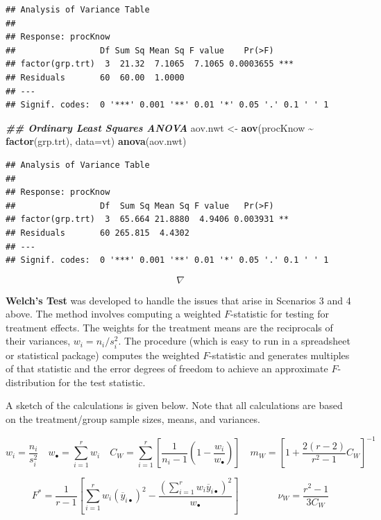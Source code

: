 \documentclass[
]{book}
\newenvironment{Shaded}{\begin{snugshade}}{\end{snugshade}}
\newcommand{\AttributeTok}[1]{\textcolor[rgb]{0.13,0.29,0.53}{#1}}
\newcommand{\DocumentationTok}[1]{\textcolor[rgb]{0.56,0.35,0.01}{\textbf{\textit{#1}}}}
\newcommand{\FunctionTok}[1]{\textcolor[rgb]{0.13,0.29,0.53}{\textbf{#1}}}
\newcommand{\NormalTok}[1]{#1}
\newcommand{\OtherTok}[1]{\textcolor[rgb]{0.56,0.35,0.01}{#1}}
\newcommand{\SpecialCharTok}[1]{\textcolor[rgb]{0.81,0.36,0.00}{\textbf{#1}}}
\begin{document}
\begin{verbatim}
## Analysis of Variance Table
## 
## Response: procKnow
##                 Df Sum Sq Mean Sq F value    Pr(>F)    
## factor(grp.trt)  3  21.32  7.1065  7.1065 0.0003655 ***
## Residuals       60  60.00  1.0000                      
## ---
## Signif. codes:  0 '***' 0.001 '**' 0.01 '*' 0.05 '.' 0.1 ' ' 1
\end{verbatim}

\begin{Shaded}
\begin{Highlighting}[]
\DocumentationTok{\#\# Ordinary Least Squares ANOVA}
\NormalTok{aov.nwt }\OtherTok{\textless{}{-}} \FunctionTok{aov}\NormalTok{(procKnow }\SpecialCharTok{\textasciitilde{}} \FunctionTok{factor}\NormalTok{(grp.trt), }\AttributeTok{data=}\NormalTok{vt)}
\FunctionTok{anova}\NormalTok{(aov.nwt)}
\end{Highlighting}
\end{Shaded}

\begin{verbatim}
## Analysis of Variance Table
## 
## Response: procKnow
##                 Df  Sum Sq Mean Sq F value   Pr(>F)   
## factor(grp.trt)  3  65.664 21.8880  4.9406 0.003931 **
## Residuals       60 265.815  4.4302                    
## ---
## Signif. codes:  0 '***' 0.001 '**' 0.01 '*' 0.05 '.' 0.1 ' ' 1
\end{verbatim}

\[ \nabla \]

\textbf{Welch's Test} was developed to handle the issues that arise in
Scenarios 3 and 4 above. The method involves computing a weighted
\(F\)-statistic for testing for treatment effects. The weights for the
treatment means are the reciprocals of their variances,
\(w_i=n_i/s_i^2\). The procedure (which is easy to run in a spreadsheet
or statistical package) computes the weighted \(F\)-statistic and
generates multiples of that statistic and the error degrees of freedom
to achieve an approximate \(F\)-distribution for the test statistic.

A sketch of the calculations is given below. Note that all calculations
are based on the treatment/group sample sizes, means, and variances.

\[
w_i = \frac{n_i}{s_i^2}  \quad w_{\bullet}=\sum_{i=1}^rw_i \quad
C_W=\sum_{i=1}^r\left[\frac{1}{n_i-1}\left(1-\frac{w_i}{w_{\bullet}}\right)
\right] \quad m_W=\left[1+\frac{2(r-2)}{r^2-1}C_W\right]^{-1}
\]

\[
F^*=\frac{1}{r-1}\left[\sum_{i=1}^rw_i\left(\overline{y}_{i\bullet}\right)^2
- \frac{\left(\sum_{i=1}^rw_i\overline{y}_{i\bullet}\right)^2}{w_{\bullet}}\right]
\qquad\qquad \nu_W=\frac{r^2-1}{3C_W}
\]
\end{document}
